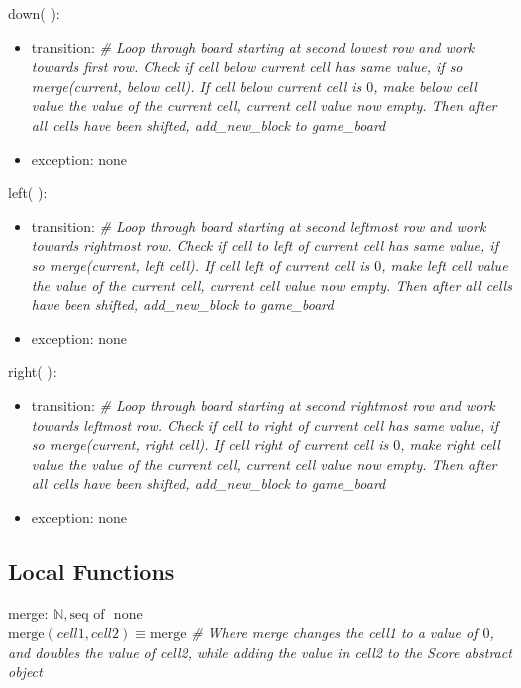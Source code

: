 \documentclass[12pt]{article}
\begin{document}
\begin{itemize}
\noindent down( ):
\begin{itemize}
\item transition: \textit{\# Loop through board starting at second lowest row and work towards first row. Check if cell below current cell has same value, if so merge(current, below cell). If cell below current cell is $0$, make below cell value the value of the current cell, current cell value now empty. Then after all cells have been shifted, add\_new\_block to game\_board} ~\\
\item exception: none
\end{itemize}

\noindent left( ):
\begin{itemize}
\item transition: \textit{\# Loop through board starting at second leftmost row and work towards rightmost row. Check if cell to left of current cell has same value, if so merge(current, left cell). If cell left of current cell is $0$, make left cell value the value of the current cell, current cell value now empty. Then after all cells have been shifted, add\_new\_block to game\_board} ~\\
\item exception: none
\end{itemize}

\noindent right( ):
\begin{itemize}
\item transition: \textit{\# Loop through board starting at second rightmost row and work towards leftmost row. Check if cell to right of current cell has same value, if so merge(current, right cell). If cell right of current cell is $0$, make right cell value the value of the current cell, current cell value now empty. Then after all cells have been shifted, add\_new\_block to game\_board} ~\\
\item exception: none
\end{itemize}

\subsection*{Local Functions}

\noindent merge:  $\mathbb{N}, \text{seq of } $ \rightarrow none \\
\noindent $\mbox{merge}(cell1, cell2) \equiv \text{merge} $
\textit{\# Where merge changes the cell1 to a value of $0$, and doubles the value of cell2, while adding the value in cell2 to the Score abstract object} ~\\


\end{itemize}
\end{document}
